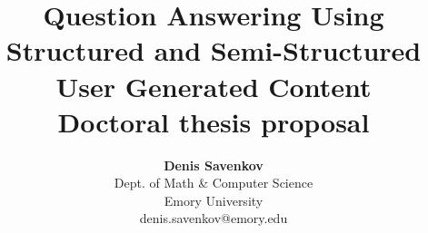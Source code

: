 \documentclass[12pt]{report}
\renewcommand{\baselinestretch}{1}
\begin{document}
\renewcommand{\baselinestretch}{1.3}



\setlength{\headsep}{0.15in}
\setlength{\topmargin}{-.5in}
\pagestyle{empty}



\title{
\textbf{Question Answering Using Structured and Semi-Structured User Generated Content} \\
\normalfont Doctoral thesis proposal}
\author{\textbf{Denis Savenkov}\\
      Dept. of Math \& Computer Science\\
      Emory University\\
      denis.savenkov@emory.edu
}



\mydate

\maketitle
\end{document}
